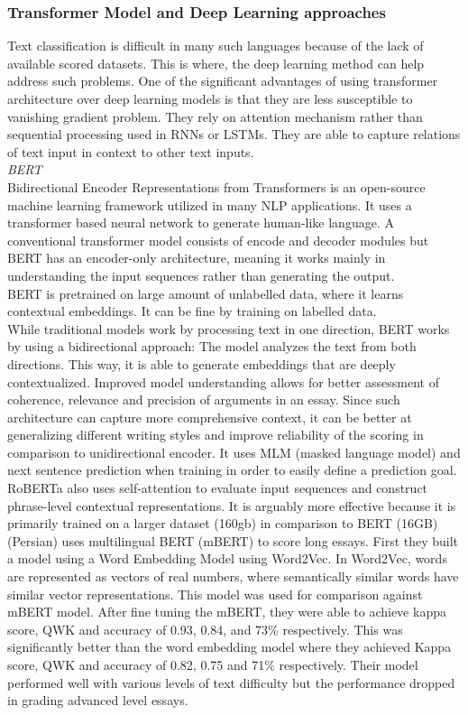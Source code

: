 \documentclass{article}
\begin{document}
	
	\subsubsection*{Transformer Model and Deep Learning approaches}
	Text classification is difficult in many such languages because of the lack of available scored datasets. This is where, the deep learning method can help address such problems. One of the significant advantages of using transformer architecture over deep learning models is that they are less susceptible to vanishing gradient problem. They rely on attention mechanism rather than sequential processing used in RNNs or LSTMs. They are able to capture relations of text input in context to other text inputs. \\
	
	
	\textit{BERT} \\
	Bidirectional Encoder Representations from Transformers is an open-source machine learning framework utilized in many NLP applications. It uses a transformer based neural network to generate human-like language. A conventional transformer model consists of encode and decoder modules but BERT has an encoder-only architecture, meaning it works mainly in understanding the input sequences rather than generating the output. \\ BERT is pretrained on large amount of unlabelled data, where it learns contextual embeddings. It can be fine by training on labelled data. \\ While traditional models work by processing text in one direction, BERT works by using a bidirectional approach: The model analyzes the text from both directions. This way, it is able to generate embeddings that are deeply contextualized. Improved model understanding allows for better assessment of coherence, relevance and precision of arguments in an essay. Since such architecture can capture more comprehensive context, it can be better at generalizing different writing styles and improve reliability of the scoring in comparison to unidirectional encoder. It uses MLM (masked language model) and next sentence prediction when training in order to easily define a prediction goal. RoBERTa also uses self-attention to evaluate input sequences and construct phrase-level contextual representations. It is arguably more effective because it is primarily trained on a larger dataset (160gb) in comparison to BERT (16GB) \\
	
	\textbf{\textcite{9_firoozi2024bert}} (Persian) uses multilingual BERT (mBERT) to score long essays. First they built a model using a Word Embedding Model using Word2Vec. In Word2Vec, words are represented as vectors of real numbers, where semantically similar words have similar vector representations. This model was used for comparison against mBERT model. After fine tuning the mBERT, they were able to achieve kappa score, QWK and accuracy of 0.93, 0.84, and 73\% respectively. This was significantly better than the word embedding model where they achieved Kappa score, QWK and accuracy of 0.82, 0.75 and 71\% respectively. Their model performed well with various levels of text difficulty but the performance dropped in grading advanced level essays. \\
	
\end{document}
